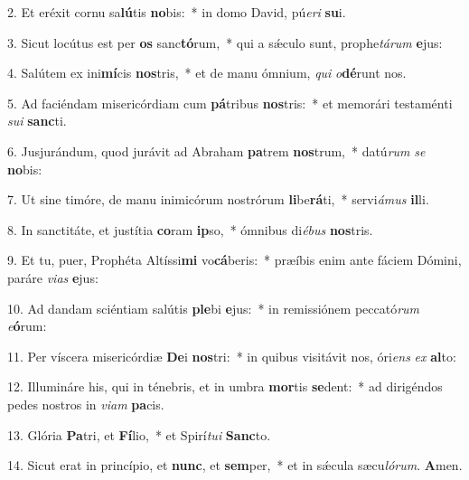 
2. Et eréxit cornu sa\textbf{lú}tis \textbf{no}bis:~* in domo David, pú\textit{e}\textit{ri} \textbf{su}i.

3. Sicut locútus est per \textbf{os} sanc\textbf{tó}rum,~* qui a s\'{\ae}culo sunt, prophe\textit{tá}\textit{rum} \textbf{e}jus:

4. Salútem ex ini\textbf{mí}cis \textbf{nos}tris,~* et de manu ómnium, \textit{qui} \textit{o}\textbf{dé}runt nos.

5. Ad faciéndam misericórdiam cum \textbf{pá}tribus \textbf{nos}tris:~* et memorári testaménti \textit{su}\textit{i} \textbf{sanc}ti.

6. Jusjurándum, quod jurávit ad Abraham \textbf{pa}trem \textbf{nos}trum,~* datú\textit{rum} \textit{se} \textbf{no}bis:

7. Ut sine timóre, de manu inimicórum nostrórum \textbf{li}be\textbf{rá}ti,~* servi\textit{á}\textit{mus} \textbf{il}li.

8. In sanctitáte, et justítia \textbf{co}ram \textbf{ip}so,~* ómnibus di\textit{é}\textit{bus} \textbf{nos}tris.

9. Et tu, puer, Prophéta Altíssi\textbf{mi} vo\textbf{cá}beris:~* præíbis enim ante fáciem Dómini, paráre \textit{vi}\textit{as} \textbf{e}jus:

10. Ad dandam sciéntiam salútis \textbf{ple}bi \textbf{e}jus:~* in remissiónem peccató\textit{rum} \textit{e}\textbf{ó}rum:

11. Per víscera misericórdiæ \textbf{De}i \textbf{nos}tri:~* in quibus visitávit nos, óri\textit{ens} \textit{ex} \textbf{al}to:

12. Illumináre his, qui in ténebris, et in umbra \textbf{mor}tis \textbf{se}dent:~* ad dirigéndos pedes nostros in \textit{vi}\textit{am} \textbf{pa}cis.

13. Glória \textbf{Pa}tri, et \textbf{Fí}lio,~* et Spirí\textit{tu}\textit{i} \textbf{Sanc}to.

14. Sicut erat in princípio, et \textbf{nunc}, et \textbf{sem}per,~* et in s\'{\ae}cula sæcu\textit{ló}\textit{rum}. \textbf{A}men.
